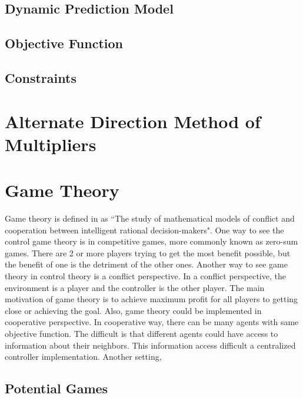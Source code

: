 \subsection{Dynamic Prediction Model}

\subsection{Objective Function}

\subsection{Constraints}



\section{Alternate Direction Method of Multipliers}
\section{Game Theory}
Game theory is defined in \cite{GameTheory2} as ``The study of mathematical models of conflict and cooperation between intelligent rational decision-makers". One way to see the control game theory is in competitive games, more commonly known as zero-sum games. There are 2 or more players trying to get the most benefit possible, but the benefit of one is the detriment of the other ones. Another way to see game theory in control theory is a conflict perspective. In a conflict perspective, the environment is a player and the controller is the other player. The main motivation of game theory is to achieve maximum profit for all players to getting close or achieving the goal. 
Also, game theory could be implemented in cooperative perspective. In cooperative way, there can be many agents with same objective function. The difficult is that different agents could have access to information about their neighbors. This information access difficult a centralized controller implementation. 
Another setting, 





\subsection{Potential Games}


